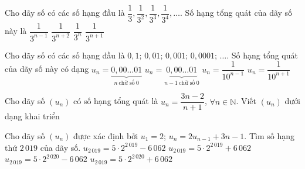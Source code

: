 \begin{ex}%
	 Cho dãy số có các số hạng đầu là $\dfrac{1}{3}, \dfrac{1}{3^2}, \dfrac{1}{3^3}, \dfrac{1}{3^4}, \ldots$. Số hạng tổng quát của dãy số này là
	\choice 
		{ $\dfrac{1}{3^{n-1}}$ } 
		{ $\dfrac{1}{3^{n+2}}$ } 
		{\True  $\dfrac{1}{3^n}$ }
		 { $\dfrac{1}{3^{n+1}}$ }
\end{ex}

\begin{ex}%
	Cho dãy số có các số hạng đầu là $0{,}1$; $0{,}01$; $0{,}001$; $0{,}0001$; $\ldots$. Số hạng tổng quát của dãy số này có dạng 
	 \choice
		{\True  $u_n=\underbrace{0{,}00 \ldots 01}_{n\ \text{chữ số}\ 0}$}
		{$u_n=\underbrace{0{,}00 \ldots 01}_{n-1 \ \text{chữ  số} \ 0}$}
		 {$u_n=\dfrac{1}{10^{n-1}}$}
		 {$u_n=\dfrac{1}{10^{n+1}}$}
\end{ex}

\begin{ex}%
	Cho dãy số $\left(u_n\right)$ có số hạng tổng quát là $u_n=\dfrac{3n-2}{n+1}$, $\forall n\in\mathbb{N}$. Viết $\left( u_n\right)$  dưới dạng khai triển
\end{ex}

\begin{ex}%
	Cho dãy số $\left(u_n\right)$ được xác định bởi $u_1=2$; $u_n=2u_{n-1}+3n-1$. Tìm số hạng thứ $2\,019$ của dãy  số.
	\choice 
		{\True  $u_{2\,019}=5\cdot 2^{2\,019}-6\,062$}
		{$u_{2\,019}=5\cdot 2^{2\,019}+6\,062$} 
		{$u_{2\,019}=5\cdot 2^{2\,020}-6\,062$} 
		{$u_{2\,019}=5\cdot  2^{2\,020}+6\,062$}
\end{ex}

